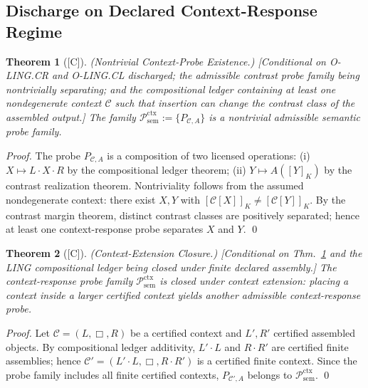 \documentclass[12pt,oneside]{amsbook}
\theoremstyle{plain}
\newtheorem{theorem}{Theorem}[section]
\theoremstyle{definition}
\theoremstyle{remark}
\newcommand{\status}[1]{\textup{[#1]}}
\begin{document}
\subsection{Discharge on Declared Context-Response Regime}
\label{sec:ling-SEM-theorems}

\begin{theorem}[\status{C}]\label{thm:ling-sem-ctx-existence}
\textup{(Nontrivial Context-Probe Existence.)}
\textup{[Conditional on O-LING.CR and O-LING.CL discharged; the
admissible contrast probe family being nontrivially separating; and
the compositional ledger containing at least one nondegenerate context
$\mathcal{C}$ such that insertion can change the contrast class of the
assembled output.]}
The family $\mathcal{P}_{\mathrm{sem}}^{\mathrm{ctx}} :=
\{P_{\mathcal{C},A}\}$ is a nontrivial admissible semantic probe family.
\end{theorem}

\begin{proof}
The probe $P_{\mathcal{C},A}$ is a composition of two licensed
operations: (i) $X \mapsto L \cdot X \cdot R$ by the compositional
ledger theorem; (ii) $Y \mapsto A([Y]_K)$ by the contrast realization
theorem. Nontriviality follows from the assumed nondegenerate context:
there exist $X, Y$ with $[\mathcal{C}[X]]_K \neq [\mathcal{C}[Y]]_K$.
By the contrast margin theorem, distinct contrast classes are positively
separated; hence at least one context-response probe separates $X$ and $Y$.
\qed
\end{proof}

\begin{theorem}[\status{C}]\label{thm:ling-sem-ctx-extension}
\textup{(Context-Extension Closure.)}
\textup{[Conditional on Thm.~\ref{thm:ling-sem-ctx-existence} and
the LING compositional ledger being closed under finite declared assembly.]}
The context-response probe family
$\mathcal{P}_{\mathrm{sem}}^{\mathrm{ctx}}$ is closed under
context extension: placing a context inside a larger certified context
yields another admissible context-response probe.
\end{theorem}

\begin{proof}
Let $\mathcal{C} = (L,\Box,R)$ be a certified context and $L', R'$
certified assembled objects. By compositional ledger additivity,
$L' \cdot L$ and $R \cdot R'$ are certified finite assemblies; hence
$\mathcal{C}' = (L' \cdot L, \Box, R \cdot R')$ is a certified finite
context. Since the probe family includes all finite certified contexts,
$P_{\mathcal{C}',A}$ belongs to $\mathcal{P}_{\mathrm{sem}}^{\mathrm{ctx}}$.
\qed
\end{proof}
\end{document}
